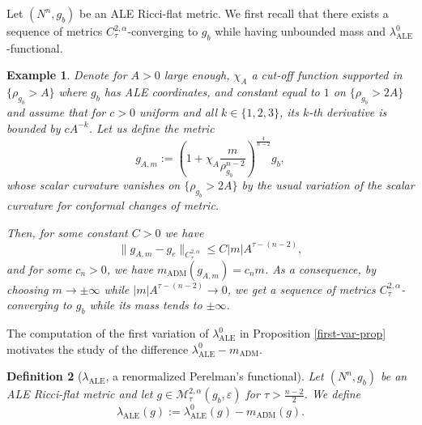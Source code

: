 \documentclass[a4paper,11pt,reqno]{amsart}
\newtheorem{defn}{Definition}[section]
\newtheorem{exmp}[defn]{Example}
\numberwithin{equation}{section}
\begin{document}
	Let $(N^n,g_b)$ be an ALE Ricci-flat metric. We first recall that there exists a sequence of metrics $C^{2,\alpha}_\tau$-converging to $ g_b $ while having unbounded mass and $\lambda_{\operatorname{ALE}}^0$-functional. 
		\begin{exmp}\label{exemple masse infinie}
		Denote for $A>0$ large enough, $\chi_A$ a cut-off function supported in $\{\rho_{g_b}>A\}$ where $g_b$ has ALE coordinates, and constant equal to $1$ on $\{\rho_{g_b}>2A\}$ and assume that for $c>0$ uniform and all $k\in \{1,2,3\}$, its $k$-th derivative is bounded by $cA^{-k}$. Let us define the metric
		$$g_{A,m}:= \left(1+\chi_A\frac{m}{\rho_{g_b}^{n-2}}\right)^{\frac{4}{n-2}}g_b,$$
		whose scalar curvature vanishes on $\{\rho_{g_b}>2A\}$ by the usual variation of the scalar curvature for conformal changes of metric.
		
		Then, for some constant $C>0$ we have $$\|g_{A,m}-g_e\|_{C^{2,\alpha}_\tau}\leq C |m|A^{\tau-(n-2)}, $$
		and for some $c_n>0$, we have $m_{\operatorname{ADM}}(g_{A,m}) = c_n m$. As a consequence, by choosing $m\to \pm \infty$ while $|m|A^{\tau-(n-2)}\to 0$, we get a sequence of metrics $C^{2,\alpha}_\tau$-converging to $g_b$ while its mass tends to $\pm\infty$.
	\end{exmp}
	
	
	The computation of the first variation of $\lambda_{\operatorname{ALE}}^0$ in Proposition \ref{first-var-prop} motivates the study of the difference $\lambda_{\operatorname{ALE}}^0-m_{\operatorname{ADM}}$.
	
	\begin{defn}[$\lambda_{\operatorname{ALE}}$, a renormalized Perelman's functional]\label{defn-ale-lambda}
		Let $(N^n,g_b)$ be an ALE Ricci-flat metric and let $g\in \mathcal{M}^{2,\alpha}_{\tau}(g_b,\varepsilon)$ for $\tau>\frac{n-2}{2}$. We define 
		$$\lambda_{\operatorname{ALE}}(g) := \lambda_{\operatorname{ALE}}^0(g)-m_{\operatorname{ADM}}(g).$$
	\end{defn}
	
\end{document}
